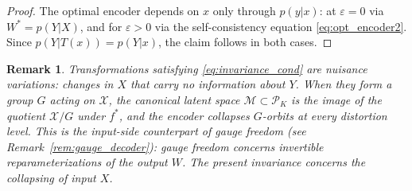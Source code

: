 \documentclass[11pt]{article}
\newtheorem{remark}{Remark}
\begin{document}
\begin{proof}
The optimal encoder depends on $x$ only through $p(y|x)$: at
$\varepsilon=0$ via $W^*=p(Y|X)$, and for $\varepsilon>0$ via the
self-consistency equation \eqref{eq:opt_encoder2}.
Since $p(Y|T(x))=p(Y|x)$, the claim follows in both cases.
\end{proof}

\begin{remark}
Transformations satisfying \eqref{eq:invariance_cond} are nuisance
variations: changes in $X$ that carry no information about $Y$.
When they form a group $G$ acting on $\mathcal{X}$, the canonical
latent space $\mathcal{M}\subset\mathcal{P}_K$ is the image of the
quotient $\mathcal{X}/G$ under $f^*$, and the encoder collapses
$G$-orbits at every distortion level.
This is the input-side counterpart of gauge freedom
(see Remark~\ref{rem:gauge_decoder}): gauge freedom concerns invertible
reparameterizations of the output $W$. The present invariance concerns
the collapsing of input $X$.
\end{remark}
\end{document}
